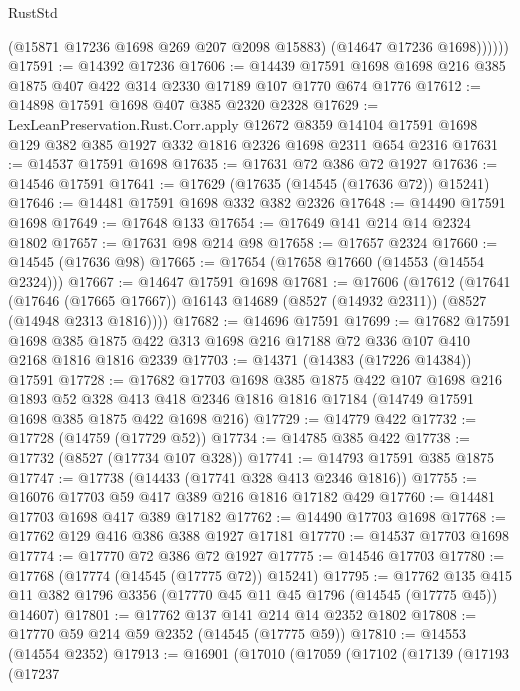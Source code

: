 \begin{lexlean}{RustStd}
\begin{coremodule}
              (@15871 @17236 @1698 @269 @207 @2098 @15883)
              (@14647 @17236 @1698))))))
@17591 := @14392 @17236
@17606 := @14439
    @17591
    @1698
    @1698
    @216
    @385
    @1875
    @407
    @422
    @314
    @2330
    @17189
    @107
    @1770
    @674
    @1776
@17612 := @14898 @17591 @1698 @407 @385 @2320 @2328
@17629 := LexLeanPreservation.Rust.Corr.apply
    @12672
    @8359
    @14104
    @17591
    @1698
    @129
    @382
    @385
    @1927
    @332
    @1816
    @2326
    @1698
    @2311
    @654
    @2316
@17631 := @14537 @17591 @1698
@17635 := @17631 @72 @386 @72 @1927
@17636 := @14546 @17591
@17641 := @17629 (@17635 (@14545 (@17636 @72)) @15241)
@17646 := @14481 @17591 @1698 @332 @382 @2326
@17648 := @14490 @17591 @1698
@17649 := @17648 @133
@17654 := @17649 @141 @214 @14 @2324 @1802
@17657 := @17631 @98 @214 @98
@17658 := @17657 @2324
@17660 := @14545 (@17636 @98)
@17665 := @17654 (@17658 @17660 (@14553 (@14554 @2324)))
@17667 := @14647 @17591 @1698
@17681 := @17606
    (@17612
      (@17641
        (@17646 (@17665 @17667))
        @16143
        @14689
        (@8527 (@14932 @2311))
        (@8527 (@14948 @2313 @1816))))
@17682 := @14696 @17591
@17699 := @17682
    @17591
    @1698
    @385
    @1875
    @422
    @313
    @1698
    @216
    @17188
    @72
    @336
    @107
    @410
    @2168
    @1816
    @1816
    @2339
@17703 := @14371 (@14383 (@17226 @14384)) @17591
@17728 := @17682
    @17703
    @1698
    @385
    @1875
    @422
    @107
    @1698
    @216
    @1893
    @52
    @328
    @413
    @418
    @2346
    @1816
    @1816
    @17184
    (@14749 @17591 @1698 @385 @1875 @422 @1698 @216)
@17729 := @14779 @422
@17732 := @17728 (@14759 (@17729 @52))
@17734 := @14785 @385 @422
@17738 := @17732 (@8527 (@17734 @107 @328))
@17741 := @14793 @17591 @385 @1875
@17747 := @17738 (@14433 (@17741 @328 @413 @2346 @1816))
@17755 := @16076 @17703 @59 @417 @389 @216 @1816 @17182 @429
@17760 := @14481 @17703 @1698 @417 @389 @17182
@17762 := @14490 @17703 @1698
@17768 := @17762 @129 @416 @386 @388 @1927 @17181
@17770 := @14537 @17703 @1698
@17774 := @17770 @72 @386 @72 @1927
@17775 := @14546 @17703
@17780 := @17768 (@17774 (@14545 (@17775 @72)) @15241)
@17795 := @17762
    @135
    @415
    @11
    @382
    @1796
    @3356
    (@17770 @45 @11 @45 @1796 (@14545 (@17775 @45)) @14607)
@17801 := @17762 @137 @141 @214 @14 @2352 @1802
@17808 := @17770 @59 @214 @59 @2352 (@14545 (@17775 @59))
@17810 := @14553 (@14554 @2352)
@17913 := @16901
    (@17010
      (@17059
        (@17102
          (@17139
            (@17193
              (@17237

\end{coremodule}
\end{lexlean}
